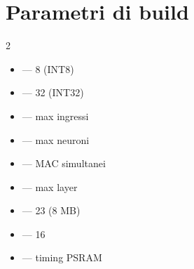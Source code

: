 \section{Parametri di build}
\begin{multicols}{2}\footnotesize
\begin{itemize}
\item {} --- 8 (INT8)
\item {} --- 32 (INT32)
\item {} --- max ingressi
\item {} --- max neuroni
\item {} --- MAC simultanei
\columnbreak
\item {} --- max layer
\item {} --- 23 (8 MB)
\item {} --- 16
\item {} --- timing PSRAM
\end{itemize}
\end{multicols}

